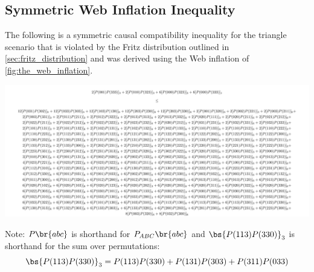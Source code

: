 \documentclass[aps, 10pt, english, twoside, pra, nofootinbib, tightenlines, longbibliography]{revtex4-1}
\begin{document}
    \subsection{Symmetric Web Inflation Inequality}
    \label{sec:symmetic_web_inequality}
    The following is a symmetric causal compatibility inequality for the triangle scenario that is violated by the Fritz distribution outlined in \cref{sec:fritz_distribution} and was derived using the Web inflation of \cref{fig:the_web_inflation}.
    \begin{center}
        \includegraphics[width=\linewidth]{../../figures/inequalities/MosekCertFritzSym_ineq_standalone}
    \end{center}
    Note: $\prob\br{abc}$ is shorthand for $\prob[ABC]\br{abc}$ and $\bs{P(113)P(330)}_3$ is shorthand for the sum over permutations:
    \[ \bs{P(113)P(330)}_3 = P(113)P(330) + P(131)P(303) + P(311)P(033) \]
\end{document}
